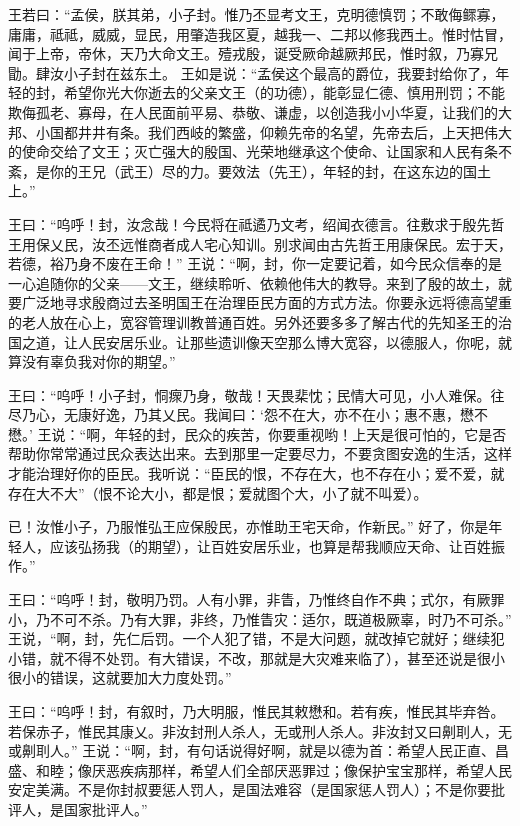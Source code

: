 \documentclass[a4paper,12pt,UTF8,twoside]{ctexbook}
\begin{document}
王若曰：“孟侯，朕其弟，小子封。惟乃丕显考文王，克明德慎罚；不敢侮鳏寡，庸庸，祗祗，威威，显民，用肇造我区夏，越我一、二邦以修我西土。惟时怙冒，闻于上帝，帝休，天乃大命文王。殪戎殷，诞受厥命越厥邦民，惟时叙，乃寡兄勖。肆汝小子封在兹东土。
王如是说：“孟侯这个最高的爵位，我要封给你了，年轻的封，希望你光大你逝去的父亲文王（的功德），能彰显仁德、慎用刑罚；不能欺侮孤老、寡母，在人民面前平易、恭敬、谦虚，以创造我小小华夏，让我们的大邦、小国都井井有条。我们西岐的繁盛，仰赖先帝的名望，先帝去后，上天把伟大的使命交给了文王；灭亡强大的殷国、光荣地继承这个使命、让国家和人民有条不紊，是你的王兄（武王）尽的力。要效法（先王），年轻的封，在这东边的国土上。”

王曰：“呜呼！封，汝念哉！今民将在祗遹乃文考，绍闻衣德言。往敷求于殷先哲王用保乂民，汝丕远惟商者成人宅心知训。别求闻由古先哲王用康保民。宏于天，若德，裕乃身不废在王命！”
王说：“啊，封，你一定要记着，如今民众信奉的是一心追随你的父亲——文王，继续聆听、依赖他伟大的教导。来到了殷的故土，就要广泛地寻求殷商过去圣明国王在治理臣民方面的方式方法。你要永远将德高望重的老人放在心上，宽容管理训教普通百姓。另外还要多多了解古代的先知圣王的治国之道，让人民安居乐业。让那些遗训像天空那么博大宽容，以德服人，你呢，就算没有辜负我对你的期望。”

王曰：“呜呼！小子封，恫瘝乃身，敬哉！天畏棐忱；民情大可见，小人难保。往尽乃心，无康好逸，乃其乂民。我闻曰：‘怨不在大，亦不在小；惠不惠，懋不懋。’
王说：“啊，年轻的封，民众的疾苦，你要重视哟！上天是很可怕的，它是否帮助你常常通过民众表达出来。去到那里一定要尽力，不要贪图安逸的生活，这样才能治理好你的臣民。我听说：“臣民的恨，不存在大，也不存在小；爱不爱，就存在大不大”（恨不论大小，都是恨；爱就图个大，小了就不叫爱）。

已！汝惟小子，乃服惟弘王应保殷民，亦惟助王宅天命，作新民。”
好了，你是年轻人，应该弘扬我（的期望），让百姓安居乐业，也算是帮我顺应天命、让百姓振作。”

王曰：“呜呼！封，敬明乃罚。人有小罪，非眚，乃惟终自作不典；式尔，有厥罪小，乃不可不杀。乃有大罪，非终，乃惟眚灾：适尔，既道极厥辜，时乃不可杀。”
王说，“啊，封，先仁后罚。一个人犯了错，不是大问题，就改掉它就好；继续犯小错，就不得不处罚。有大错误，不改，那就是大灾难来临了），甚至还说是很小很小的错误，这就要加大力度处罚。”

王曰：“呜呼！封，有叙时，乃大明服，惟民其敕懋和。若有疾，惟民其毕弃咎。若保赤子，惟民其康乂。非汝封刑人杀人，无或刑人杀人。非汝封又曰劓刵人，无或劓刵人。”
王说：“啊，封，有句话说得好啊，就是以德为首：希望人民正直、昌盛、和睦；像厌恶疾病那样，希望人们全部厌恶罪过；像保护宝宝那样，希望人民安定美满。不是你封叔要惩人罚人，是国法难容（是国家惩人罚人）；不是你要批评人，是国家批评人。”
\end{document}
